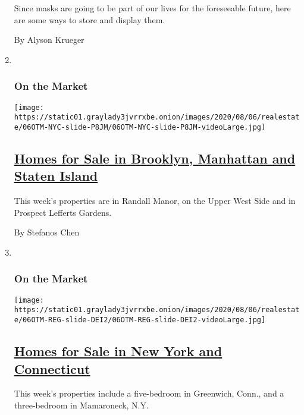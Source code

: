 \begin{enumerate}
  Since masks are going to be part of our lives for the foreseeable
  future, here are some ways to store and display them.

  By Alyson Krueger
\item ~
  \hypertarget{on-the-market}{%
  \subsubsection{On the Market}\label{on-the-market}}

  \texttt{[image: https://static01.graylady3jvrrxbe.onion/images/2020/08/06/realestate/06OTM-NYC-slide-P8JM/06OTM-NYC-slide-P8JM-videoLarge.jpg]}

  \hypertarget{homes-for-sale-in-brooklyn-manhattan-and-staten-island}{%
  \subsection{\texorpdfstring{\href{/2020/08/06/realestate/homes-for-sale-in-brooklyn-manhattan-and-staten-island.html}{Homes
  for Sale in Brooklyn, Manhattan and Staten
  Island}}{Homes for Sale in Brooklyn, Manhattan and Staten Island}}\label{homes-for-sale-in-brooklyn-manhattan-and-staten-island}}

  This week's properties are in Randall Manor, on the Upper West Side
  and in Prospect Lefferts Gardens.

  By Stefanos Chen
\item ~
  \hypertarget{on-the-market-1}{%
  \subsubsection{On the Market}\label{on-the-market-1}}

  \texttt{[image: https://static01.graylady3jvrrxbe.onion/images/2020/08/06/realestate/06OTM-REG-slide-DEI2/06OTM-REG-slide-DEI2-videoLarge.jpg]}

  \hypertarget{homes-for-sale-in-new-york-and-connecticut}{%
  \subsection{\texorpdfstring{\href{/2020/08/06/realestate/homes-for-sale-in-new-york-and-connecticut.html}{Homes
  for Sale in New York and
  Connecticut}}{Homes for Sale in New York and Connecticut}}\label{homes-for-sale-in-new-york-and-connecticut}}

  This week's properties include a five-bedroom in Greenwich, Conn., and
  a three-bedroom in Mamaroneck, N.Y.


\end{enumerate}
